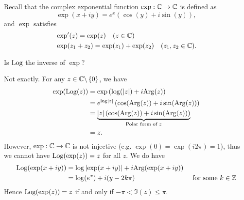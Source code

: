 \bigskip

Recall that the complex exponential function $\exp: \mathbb{C} \to \mathbb{C}$ is defined as
\begin{equation}
\label{e:exp}
\exp(x+iy) = e^x \left( \cos (y) + i \sin (y) \right),
\end{equation}
and $\exp$ satisfies
\begin{align}
& \exp' (z) =\exp (z) \quad (z \in \mathbb{C}) \\
& \exp (z_1+z_2) = \exp(z_1)+\exp(z_2) \quad (z_1,z_2 \in \mathbb{C}).
\end{align}
\begin{questions}
\question
Is $\operatorname{Log}$ the inverse of $\exp$?
\end{questions}
Not exactly.  For any $z \in \mathbb{C} \backslash \left\{0\right\}$, we have
\begin{align*}
\exp ( \operatorname{Log} (z)) & = \exp \left( \log ( \left| z \right| ) + i \mathrm{Arg} (z) \right) \\
& = e^{\log \left| z \right|} \left( \cos ( \mathrm{Arg} (z))+i \sin ( \mathrm{Arg} (z) ) \right) \\
& = \underbrace{\left| z \right|\left( \cos ( \mathrm{Arg} (z))+i \sin ( \mathrm{Arg} (z) ) \right)}_{\text{Polar form of }z} \\
& = z.
\end{align*}
However, $\exp:\mathbb{C} \to \mathbb{C}$ is not injective (e.g. $\exp(0)=\exp(i2\pi)=1$), thus we cannot have $\operatorname{Log} ( \exp(z)) = z$ for all $z$.  We do have
\begin{align*}
\operatorname{Log} ( \exp (x+iy ) ) & = \log \left| \exp(x+iy) \right| + i \mathrm{Arg} (\exp(x+iy)) &&\\
& = \log(e^x) + i (y-2k\pi) && \text{ for some }k \in \mathbb{Z} \\
\end{align*}
Hence $\operatorname{Log} (\exp(z))=z$ if and only if $-\pi<\Im(z) \leq \pi$.


